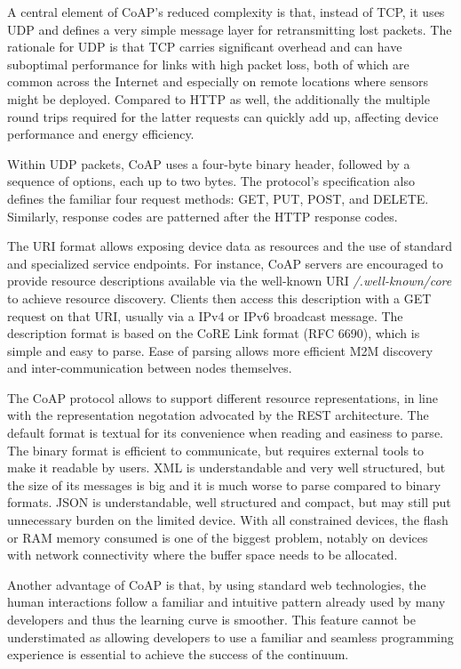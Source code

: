 \documentclass{ieeeaccess}
\begin{document}
A central element of CoAP's reduced complexity is that, instead of TCP, it uses UDP and defines a very simple message layer for retransmitting lost packets. The rationale for UDP is that TCP carries significant overhead and can have suboptimal performance for links with high packet loss, both of which are common across the Internet \cite{akamai} and especially on remote locations where sensors might be deployed. Compared to HTTP as well, the additionally the multiple round trips required for the latter requests can quickly add up, affecting device performance and energy efficiency.

Within UDP packets, CoAP uses a four-byte binary header, followed by a sequence of options, each up to two bytes. The protocol's specification also defines the familiar four request methods: GET, PUT, POST, and DELETE. Similarly, response codes are patterned after the HTTP response codes.

The URI format allows exposing device data as resources and the use of standard and specialized service endpoints. For instance, CoAP servers are encouraged to provide resource descriptions available via the well-known URI \emph{/.well-known/core} to achieve resource discovery. Clients then access this description with a GET request on that URI, usually via a IPv4 or IPv6 broadcast message. The description format is based on the CoRE Link format (RFC 6690), which is simple and easy to parse. Ease of parsing allows more efficient M2M discovery and inter-communication between nodes themselves.

The CoAP protocol allows to support different resource representations, in line with the representation negotation advocated by the REST architecture. The default format is textual for its convenience when reading and easiness to parse. The binary format is efficient to communicate, but requires external tools to make it readable by users. XML is understandable and very well structured, but the size of its messages is big and it is much worse to parse compared to binary formats. JSON is understandable, well structured and compact, but may still put unnecessary burden on the limited device. With all constrained devices, the flash or RAM memory consumed is one of the biggest problem, notably on devices with network connectivity where the buffer space needs to be allocated.

Another advantage of CoAP is that, by using standard web technologies, the human interactions follow a familiar and intuitive pattern already used by many developers and thus the learning curve is smoother. This feature cannot be understimated as allowing developers to use a familiar and seamless programming experience is essential to achieve the success of the continuum.
\end{document}
